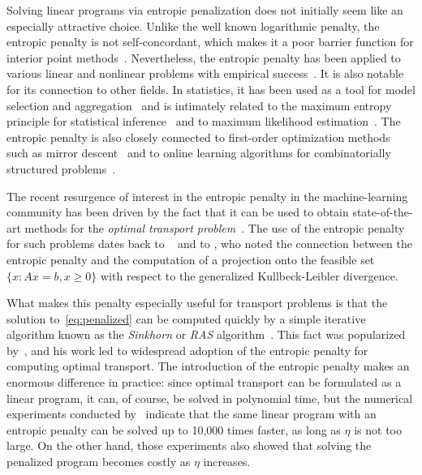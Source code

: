 \documentclass[final,12pt]{colt2018}
\newcommand{\1}{\mathds{1}}
\begin{document}
Solving linear programs via entropic penalization does not initially seem like an especially attractive choice.
Unlike the well known logarithmic penalty, the entropic penalty is not self-concordant, which makes it a poor barrier function for interior point methods~\citep{BoyVan04}.
Nevertheless, the entropic penalty has been applied to various linear and nonlinear problems with empirical success~\citep{FanRajTsa97}.
It is also notable for its connection to other fields.
In statistics, it has been used as a tool for model selection and aggregation~\citep{JudRigTsy08,RigTsy11} and is intimately related to the maximum entropy principle for statistical inference~\citep{Jay82} and to maximum likelihood estimation~\citep{ChrHer00}.
The entropic penalty is also closely connected to first-order optimization methods such as mirror descent~\citep{Bub15} and to online learning algorithms for combinatorially structured problems~\citep{FreSch97,CesLug06,HelWar09,KooWarKiv10,AudBubLug13}.

The recent resurgence of interest in the entropic penalty in the machine-learning community has been driven by the fact that it can be used to obtain state-of-the-art methods for the \emph{optimal transport problem}~\citep{Cut13,CutDou14,SolDe-Pey15,GenCutPey16,BenCarNen16,AltWeeRig17}.
The use of the entropic penalty for such problems dates back to \citet{Sch31}~\citep[see][]{Leo14} and to \citet{Bre67}, who noted the connection between the entropic penalty and the computation of a projection onto the feasible set $\{x: Ax = b, x \geq 0\}$ with respect to the generalized Kullbeck-Leibler divergence.


What makes this penalty especially useful for transport problems is that the solution to~\eqref{eq:penalized} can be computed quickly by a simple iterative algorithm known as the \emph{Sinkhorn} or \emph{RAS} algorithm~\citep{Sin67}.
This fact was popularized by~\citet{Cut13}, and his work led to widespread adoption of the entropic penalty for computing optimal transport.
The introduction of the entropic penalty makes an enormous difference in practice:
since optimal transport can be formulated as a linear program, it can, of course, be solved in polynomial time, but the numerical experiments conducted by~\citet{Cut13} indicate that the same linear program with an entropic penalty can be solved up to 10,000 times faster, as long as $\eta$ is not too large.
On the other hand, those experiments also showed that solving the penalized program becomes costly as $\eta$ increases.
\end{document}
